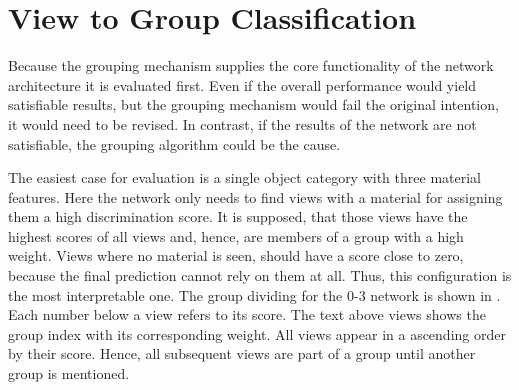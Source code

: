 \section{View to Group Classification}
\label{sec:results-grouping}
Because the grouping mechanism supplies the core functionality of the network architecture it is evaluated first.
Even if the overall performance would yield satisfiable results, but the grouping mechanism would fail the original intention, it would need to be revised.
In contrast, if the results of the network are not satisfiable, the grouping algorithm could be the cause.

The easiest case for evaluation is a single object category with three material features.
Here the network only needs to find views with a material for assigning them a high discrimination score.
It is supposed, that those views have the highest scores of all views and, hence, are members of a group with a high weight.
Views where no material is seen, should have a score close to zero, because the final prediction cannot rely on them at all.
Thus, this configuration is the most interpretable one.
The group dividing for the 0-3 network is shown in .
Each number below a view refers to its score.
The text above views shows the group index with its corresponding weight.
All views appear in a ascending order by their score.
Hence, all subsequent views are part of a group until another group is mentioned.
